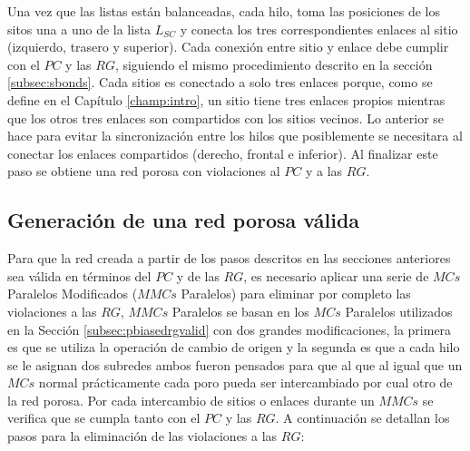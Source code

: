 Una vez que las listas están balanceadas, cada hilo, toma las posiciones de los sitos una a uno de la lista $L_{SC}$ y conecta los tres correspondientes enlaces al sitio (izquierdo, trasero y superior). Cada conexión entre sitio y enlace debe cumplir con el $PC$ y las $RG$, siguiendo el mismo procedimiento descrito en la sección \ref{subsec:sbonds}. Cada sitios es conectado a solo tres enlaces porque, como se define en el Capítulo \ref{champ:intro}, un sitio tiene tres enlaces propios mientras que los otros tres enlaces son compartidos con los sitios vecinos. Lo anterior se hace para evitar la sincronización entre los hilos que posiblemente se necesitara al conectar los enlaces compartidos (derecho, frontal e inferior). Al finalizar este paso se obtiene una red porosa con violaciones al $PC$ y a las $RG$.

\subsection{Generación de una red porosa válida}
\label{subsec:pvalid}
Para que la red creada a partir de los pasos descritos en las secciones anteriores sea válida en términos del $PC$ y de las $RG$, es necesario aplicar una serie de $MCs$ Paralelos Modificados ($MMCs$ Paralelos) para eliminar por completo las violaciones a las $RG$, $MMCs$ Paralelos se basan en los $MCs$ Paralelos utilizados en la Secci\'on \ref{subsec:pbiasedrgvalid} con dos grandes modificaciones, la primera es que se utiliza la operación de cambio de origen y la segunda es que a cada hilo se le asignan dos subredes ambos fueron pensados para que al que al igual que un $MCs$ normal prácticamente cada poro pueda ser intercambiado por cual otro de la red porosa. Por cada intercambio de sitios o enlaces durante un $MMCs$ se verifica que se cumpla tanto con el $PC$ y las $RG$. A continuación se detallan los pasos para la eliminación de las violaciones a las $RG$:

